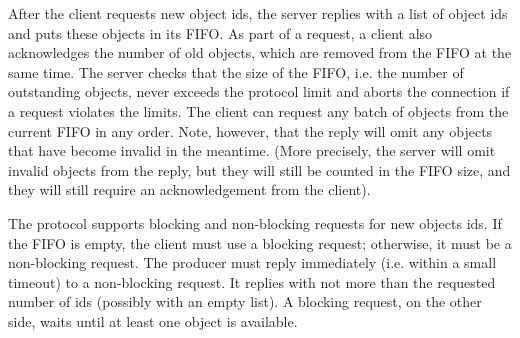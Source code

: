 After the client requests new object ids, the server replies with a list of
object ids and puts these objects in its FIFO. As part of a request, a client
also acknowledges the number of old objects, which are removed from the FIFO at
the same time. The server checks that the size of the FIFO, i.e. the number of
outstanding objects, never exceeds the protocol limit and aborts the connection
if a request violates the limits. The client can request any batch of objects
from the current FIFO in any order. Note, however, that the reply will omit any
objects that have become invalid in the meantime. (More precisely, the server
will omit invalid objects from the reply, but they will still be counted in the
FIFO size, and they will still require an acknowledgement from the client).

The protocol supports blocking and non-blocking requests for new objects ids. If
the FIFO is empty, the client must use a blocking request; otherwise, it must be
a non-blocking request. The producer must reply immediately (i.e. within a small
timeout) to a non-blocking request. It replies with not more than the requested
number of ids (possibly with an empty list). A blocking request, on the other
side, waits until at least one object is available.


